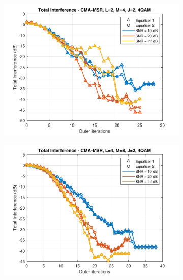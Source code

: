 \begin{figure}
	\centering
	\begin{subfigure}[b]{0.45\textwidth}
		\includegraphics[width=\linewidth]{./figs/BF_RTR_MSR_TI_4QAM_L=2_M=4_J=2_K=1000.pdf}
		\label{fig:rtr_msr_ti4_24}
	\end{subfigure}
	\begin{subfigure}[b]{0.45\textwidth}
		\includegraphics[width=\linewidth]{./figs/BF_RTR_MSR_TI_4QAM_L=4_M=8_J=2_K=1000.pdf}
		\label{fig:rtr_msr_ti4_48}
	\end{subfigure}\\
	\begin{subfigure}[b]{0.45\textwidth}

\end{subfigure}
\end{figure}
